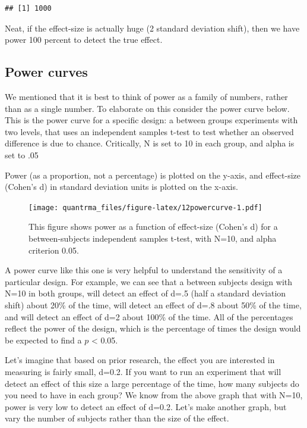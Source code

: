 \documentclass[
]{book}
\begin{document}
\begin{verbatim}
## [1] 1000
\end{verbatim}

Neat, if the effect-size is actually huge (2 standard deviation shift), then we have power 100 percent to detect the true effect.

\hypertarget{power-curves}{%
\subsection{Power curves}\label{power-curves}}

We mentioned that it is best to think of power as a family of numbers, rather than as a single number. To elaborate on this consider the power curve below. This is the power curve for a specific design: a between groups experiments with two levels, that uses an independent samples t-test to test whether an observed difference is due to chance. Critically, N is set to 10 in each group, and alpha is set to .05

Power (as a proportion, not a percentage) is plotted on the y-axis, and effect-size (Cohen's d) in standard deviation units is plotted on the x-axis.

\begin{figure}
\centering
\texttt{[image: quantrma\_files/figure-latex/12powercurve-1.pdf]}
\caption{\label{fig:12powercurve}This figure shows power as a function of effect-size (Cohen's d) for a between-subjects independent samples t-test, with N=10, and alpha criterion 0.05.}
\end{figure}

A power curve like this one is very helpful to understand the sensitivity of a particular design. For example, we can see that a between subjects design with N=10 in both groups, will detect an effect of d=.5 (half a standard deviation shift) about 20\% of the time, will detect an effect of d=.8 about 50\% of the time, and will detect an effect of d=2 about 100\% of the time. All of the percentages reflect the power of the design, which is the percentage of times the design would be expected to find a \(p\) \textless{} 0.05.

Let's imagine that based on prior research, the effect you are interested in measuring is fairly small, d=0.2. If you want to run an experiment that will detect an effect of this size a large percentage of the time, how many subjects do you need to have in each group? We know from the above graph that with N=10, power is very low to detect an effect of d=0.2. Let's make another graph, but vary the number of subjects rather than the size of the effect.
\end{document}
